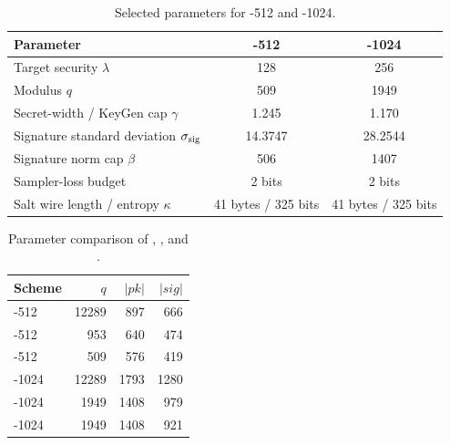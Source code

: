 \begin{table}[t]

\centering\small
\caption{Selected parameters for \FalconPP{}-512 and \FalconPP{}-1024.}
\label{tab:falconpp-parameters}
\setlength{\tabcolsep}{4pt}
\renewcommand{\arraystretch}{1.08}
\begin{tabular}{@{}lcc@{}}
\toprule
Parameter & \FalconPP{}-512 & \FalconPP{}-1024\\
\midrule
Target security $\lambda$ & 128 & 256\\
Modulus $q$ & 509 & 1949\\
Secret-width / KeyGen cap $\gamma$ & 1.245 & 1.170\\
Signature standard deviation $\sigma_{\rm sig}$ & 14.3747 & 28.2544\\
Signature norm cap $\beta$ & 506 & 1407\\
Sampler-loss budget & 2 bits & 2 bits\\
Salt wire length / entropy $\kappa$ & 41 bytes / 325 bits & 41 bytes / 325 bits\\
\bottomrule
\end{tabular}
\end{table}

\begin{table}[t]

\centering\small
\caption{Parameter comparison of \FalconPlus{},
\FalconWS{}, and \FalconPP{}.}
\label{tab:key-size-comparison}
\setlength{\tabcolsep}{5pt}
\renewcommand{\arraystretch}{1.10}
\begin{tabular}{@{}lrrr@{}}
\toprule
Scheme & $q$ & $|pk|$ & $|sig|$\\
\midrule
\FalconPlus{}-512~\cite{FalconSpec2020,FouqueEtAl2026CloserFalcon} & 12289 & 897 & 666\\
\FalconWS{}-512~\cite{ZhangEtAl2025WeakSmoothness} & 953 & 640 & 474\\
\FalconPP{}-512 & 509 & 576 & 419\\
\midrule
\FalconPlus{}-1024~\cite{FalconSpec2020,FouqueEtAl2026CloserFalcon} & 12289 & 1793 & 1280\\
\FalconWS{}-1024~\cite{ZhangEtAl2025WeakSmoothness} & 1949 & 1408 & 979\\
\FalconPP{}-1024 & 1949 & 1408 & 921\\
\bottomrule
\end{tabular}
\end{table}

